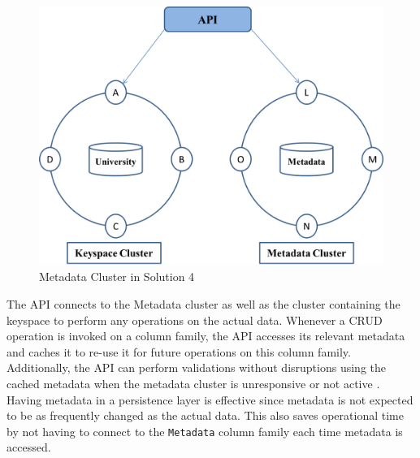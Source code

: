 \begin{figure}[h]
	\centering
	\includegraphics[width=.6\textwidth]{./figure/Solutions/Sol4-cluster-pic.png}
	\caption{Metadata Cluster in Solution
	4}\label{fd:MetadataCluster-Solution4}
	
\end{figure}
 The \ac{API} connects to the Metadata cluster as well as
the cluster containing the keyspace to perform any operations on the actual
data.  Whenever a \ac{CRUD} operation is invoked on a column family,  the \ac{API}
accesses its relevant metadata and caches it to re-use it for future operations
on this column family. 
Additionally,  the \ac{API} can perform validations without disruptions using the
cached metadata when the metadata cluster is unresponsive or not active . 
Having metadata in a persistence layer is effective since metadata is not
expected to be as frequently changed as the actual data.  This also saves
operational time by not having to connect to the
\texttt{Metadata} column family each time  metadata is accessed. 




